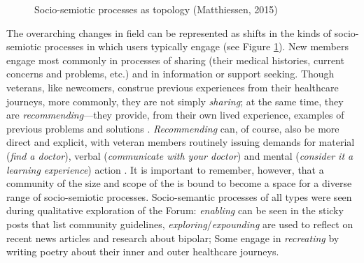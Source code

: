 \begin{figure}[htb]
\centering
{}
\caption[Socio-semiotic processes]{Socio-semiotic processes as topology (Matthiessen, 2015)}
\label{fig:pie-of-fortune}
\end{figure} 

The overarching changes in field can be represented as shifts in the kinds of socio\hyp{}semiotic processes in which users typically engage (see Figure \ref{fig:pie-of-fortune}). New \glspl{member} engage most commonly in processes of sharing (their medical histories, current concerns and problems, etc.) and in information or support seeking. Though veterans, like newcomers, construe previous experiences from their healthcare journeys, more commonly, they are not simply \emph{sharing}; at the same time, they are \emph{recommending}---they provide, from their own lived experience, examples of previous problems and solutions \cite{koteyko2015performing}. \emph{Recommending} can, of course, also be more direct and explicit, with veteran \glspl{member} routinely issuing demands for material (\emph{find a doctor}), verbal (\emph{communicate with your doctor}) and mental (\emph{consider it a learning experience}) action \cite{pfeil_social_2011}. It is important to remember, however, that a community of the size and scope of the  is bound to become a space for a diverse range of socio\hyp{}semiotic processes. Socio\hyp{}semantic processes of all types were seen during qualitative exploration of the \gls{Forum}: \emph{enabling} can be seen in the sticky \glspl{post} that list community guidelines, \emph{exploring}\slash \emph{expounding} are used to reflect on recent news articles and research about \gls{bipolar}; Some  engage in \emph{recreating} by writing poetry about their inner and outer healthcare journeys. 

